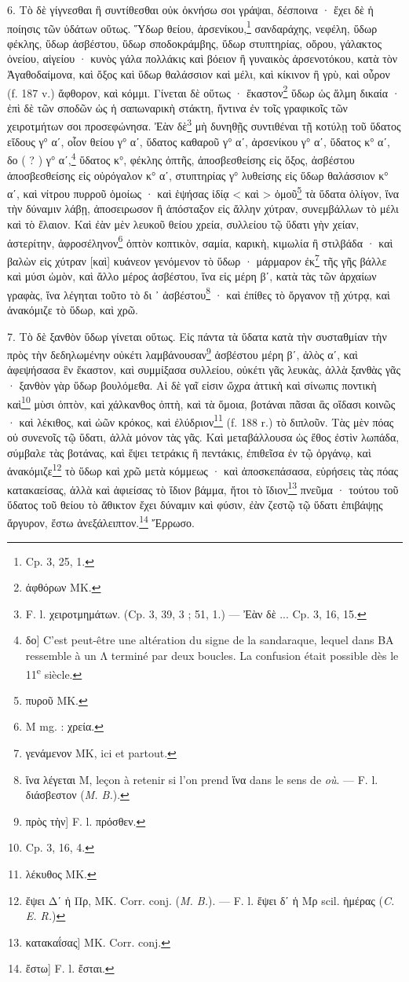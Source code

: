 \documentclass[a4paper, 11pt, oneside, polutonikogreek, french]{article}
\begin{document}
6. Τὸ δὲ γίγνεσθαι ἢ συντίθεσθαι οὐκ ὀκνήσω σοι γράψαι, δέσποινα · ἔχει δὲ ἡ ποίησις τῶν ὑδάτων οὕτως. Ὕδωρ θείου, ἀρσενίκου,\footnote{Cp. 3, 25, 1.} σανδαράχης, νεφέλη, ὕδωρ φέκλης, ὕδωρ ἀσβέστου, ὕδωρ σποδοκράμβης, ὕδωρ στυπτηρίας, οὄρου, γάλακτος ὀνείου, αἰγείου · κυνὸς γάλα πολλάκις καὶ βόειον ἢ γυναικὸς ἀρσενοτόκου, κατὰ τὸν Ἀγαθοδαίμονα, καὶ ὄξος καὶ ὕδωρ θαλάσσιον καὶ μέλι, καὶ κίκινον ἢ γρὺ, καὶ οὖρον (f. 187 v.) ἄφθορον, καὶ κόμμι. Γίνεται δὲ οὕτως · ἕκαστον\footnote{ἀφθόρων MK.} ὕδωρ ὡς ἅλμη δικαία · ἐπὶ δὲ τῶν σποδῶν ὡς ἡ σαπωναρικὴ στάκτη, ἥντινα ἐν τοῖς γραφικοῖς τῶν χειροτμήτων σοι προσεφώνησα. Ἐὰν δὲ\footnote{F. l. χειροτμημάτων. (Cp. 3, 39, 3 ; 51, 1.) --- Ἐὰν δὲ ... Cp. 3, 16, 15.} μὴ δυνηθῇς συντιθέναι τῇ κοτύλῃ τοῦ ὕδατος εἴδους γ° αʹ, οἷον θείου γ° αʹ, ὕδατος καθαροῦ γ° αʹ, ἀρσενίκου γ° αʹ, ὕδατος κ° αʹ, δο ( ? ) γ° αʹ,\footnote{δο] C'est peut-être une altération du signe de la sandaraque, lequel dans BA ressemble à un Λ terminé par deux boucles. La confusion était possible dès le 11\textsuperscript{e} siècle.} ὕδατος κ°, φέκλης ὀπτῆς, ἀποσβεσθείσης εἰς ὄξος, ἀσβέστου ἀποσβεσθείσης εἰς οὐρόγαλον κ° αʹ, στυπτηρίας γ° λυθείσης εἰς ὕδωρ θαλάσσιον κ° αʹ, καὶ νίτρου πυρροῦ ὁμοίως · καὶ ἑψήσας ἰδίᾳ < καὶ > ὁμοῦ\footnote{πυροῦ MK.} τὰ ὕδατα ὀλίγον, ἵνα τὴν δύναμιν λάβῃ, ἀποσειρωσον ἢ ἀπόσταξον εἰς ἄλλην χύτραν, συνεμβάλλων τὸ μέλι καὶ τὸ ἔλαιον. Καὶ ἐὰν μὲν λευκοῦ θείου χρεία, συλλείου τῷ ὕδατι γὴν χείαν, ἀστερίτην, ἀφροσέληνον\footnote{M mg. : χρεία.} ὀπτὸν κοπτικὸν, σαμία, καρικὴ, κιμωλία ἢ στιλβάδα · καὶ βαλὼν εἰς χύτραν [καὶ] κυάνεον γενόμενον τὸ ὕδωρ · μάρμαρον ἐκ\footnote{γενάμενον MK, ici et partout.} τῆς γῆς βάλλε καὶ μύσι ὠμὸν, καὶ ἄλλο μέρος ἀσβέστου, ἵνα εἰς μέρη βʹ, κατὰ τὰς τῶν ἀρχαίων γραφὰς, ἵνα λέγηται τοῦτο τὸ δι ᾽ ἀσβέστου\footnote{ἵνα λέγεται M, leçon à retenir si l'on prend ἵνα dans le sens de \emph{où}. --- F. l. διάσβεστον (\emph{M. B.}).} · καὶ ἐπίθες τὸ ὄργανον τῇ χύτρᾳ, καὶ ἀνακόμιζε τὸ ὕδωρ, καὶ χρῶ.

7. Τὸ δὲ ξανθὸν ὕδωρ γίνεται οὕτως. Εἰς πάντα τὰ ὕδατα κατὰ τὴν συσταθμίαν τὴν πρὸς τὴν δεδηλωμένην οὐκέτι λαμβάνουσαν\footnote{πρὸς τὴν] F. l. πρόσθεν.} ἀσβέστου μέρη βʹ, ἀλὸς αʹ, καὶ ἀφεψήσασα ἓν ἕκαστον, καὶ συμμίξασα συλλείου, οὐκέτι γᾶς λευκὰς, ἀλλὰ ξανθὰς γᾶς · ξανθὸν γὰρ ὕδωρ βουλόμεθα. Αἱ δὲ γαῖ εἰσιν ὤχρα ἀττικὴ καὶ σίνωπις ποντικὴ καὶ\footnote{Cp. 3, 16, 4.} μὺσι ὀπτὸν, καὶ χάλκανθος ὀπτὴ, καὶ τὰ ὅμοια, βοτάναι πᾶσαι ἃς οἴδασι κοινῶς · καὶ λέκιθος, καὶ ὠῶν κρόκος, καὶ ἐλύδριον\footnote{λέκυθος MK.} (f. 188 r.) τὸ διπλοῦν. Τὰς μὲν πόας οὐ συνενοῖς τῷ ὕδατι, ἀλλὰ μόνον τὰς γᾶς. Καὶ μεταβάλλουσα ὡς ἔθος ἐστὶν λωπάδα, σύμβαλε τὰς βοτάνας, καὶ ἕψει τετράκις ἢ πεντάκις, ἐπιθεῖσα ἐν τῷ ὀργάνῳ, καὶ ἀνακόμιζε\footnote{ἔψει Δʹ ἡ Πρ, MK. Corr. conj. (\emph{M. B.}). --- F. l. ἕψει δʹ ἡ Μρ scil. ἡμέρας (\emph{C. E. R.})} τὸ ὕδωρ καὶ χρῶ μετὰ κόμμεως · καὶ ἀποσκεπάσασα, εὑρήσεις τὰς πόας κατακαείσας, ἀλλὰ καὶ ἀφιείσας τὸ ἴδιον βάμμα, ἤτοι τὸ ἴδιον\footnote{κατακαΐσας] MK. Corr. conj.} πνεῦμα · τούτου τοῦ ὕδατος τοῦ θείου τὸ ἄθικτον ἔχει δύναμιν καὶ φύσιν, ἐὰν ζεστῷ τῷ ὕδατι ἐπιβάψῃς ἄργυρον, ἔστω ἀνεξάλειπτον.\footnote{ἔστω] F. l. ἔσται.} Ἔρρωσο.
\end{document}

